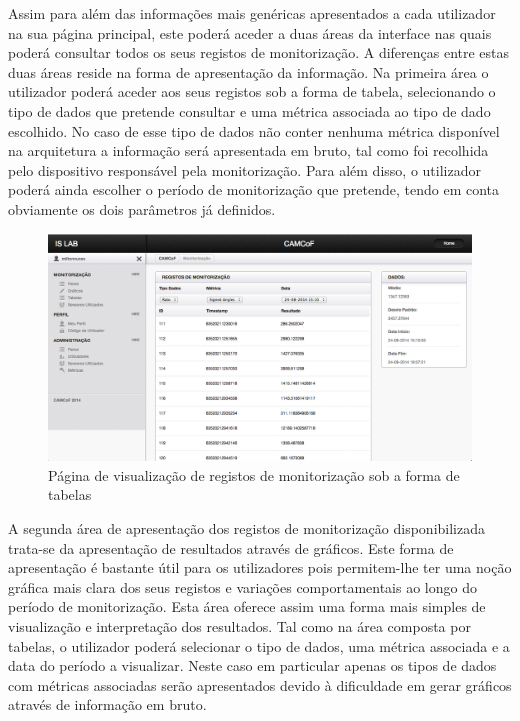 Assim para além das informações mais genéricas apresentados a cada utilizador na sua página principal, este poderá aceder a duas áreas da interface nas quais poderá consultar todos os seus registos de monitorização. A diferenças entre estas duas áreas reside na forma de apresentação da informação. Na primeira área o utilizador poderá aceder aos seus registos sob a forma de tabela, selecionando o tipo de dados que pretende consultar e uma métrica associada ao tipo de dado escolhido. No caso de esse tipo de dados não conter nenhuma métrica disponível na arquitetura a informação será apresentada em bruto, tal como foi recolhida pelo dispositivo responsável pela monitorização. Para além disso, o utilizador poderá ainda escolher o período de monitorização que pretende, tendo em conta obviamente os dois parâmetros já definidos.

 \begin{figure}[htb]
   \centering
   \includegraphics[scale=0.29]{Images/tables.png}
   \caption{Página de visualização de registos de monitorização sob a forma de tabelas}
\end{figure}

A segunda área de apresentação dos registos de monitorização disponibilizada trata-se da apresentação de resultados através de gráficos. Este forma de apresentação é bastante útil para os utilizadores pois permitem-lhe ter uma noção gráfica mais clara dos seus registos e variações comportamentais ao longo do período de monitorização. Esta área oferece assim uma forma mais simples de visualização e interpretação dos resultados. Tal como na área composta por tabelas, o utilizador poderá selecionar o tipo de dados, uma métrica associada e a data do período a visualizar. Neste caso em particular apenas os tipos de dados com métricas associadas serão apresentados devido à dificuldade em gerar gráficos através de informação em bruto.

